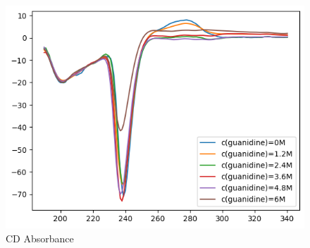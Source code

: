 \documentclass{report}
\begin{document}
\begin{figure}
    \centering
    \includegraphics[width=1\linewidth]{../Figures/CD absorbance.png}
    \caption{CD Absorbance}
    \label{CD Absorbance}
\end{figure}
\end{document}
